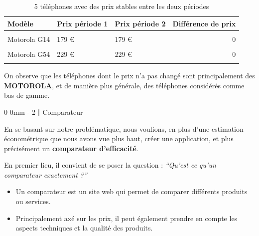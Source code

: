 \documentclass[
  12pt,
]{report}
\makeatletter
\renewcommand{\chapter}{%
    \clearpage %
    \@startsection{chapter}%
    {0} %
    {0mm} %
    {-\baselineskip} %
    {2\baselineskip} %
    {\normalfont\Huge\bfseries | \Huge\bfseries}%
}
\makeatother
\begin{document}
\begin{table}[!h]

\caption{\label{tab:unnamed-chunk-22}5 téléphones avec des prix stables entre les deux périodes}
\centering
\begin{tabular}[t]{lllr}
\toprule
\textbf{Modèle} & \textbf{Prix période 1} & \textbf{Prix période 2} & \textbf{Différence de prix}\\
\midrule
\cellcolor{gray!6}{MOTOROLA EDGE 40 NEO} & \cellcolor{gray!6}{399 €} & \cellcolor{gray!6}{399 €} & \cellcolor{gray!6}{0}\\
Motorola G14 & 179 € & 179 € & 0\\
\cellcolor{gray!6}{Motorola G53} & \cellcolor{gray!6}{199 €} & \cellcolor{gray!6}{199 €} & \cellcolor{gray!6}{0}\\
Motorola G54 & 229 € & 229 € & 0\\
\cellcolor{gray!6}{Motorola G84} & \cellcolor{gray!6}{299 €} & \cellcolor{gray!6}{299 €} & \cellcolor{gray!6}{0}\\
\bottomrule
\end{tabular}
\end{table}

On observe que les téléphones dont le prix n'a pas changé sont
principalement des \textbf{MOTOROLA}, et de manière plus générale, des
téléphones considérés comme bas de gamme.

\chapter{Comparateur}\label{comparateur}

En se basant sur notre problématique, nous voulions, en plus d'une
estimation économétrique que nous avons vue plus haut, créer une
application, et plus précisément un \textbf{comparateur d'efficacité}.

En premier lieu, il convient de se poser la question : \emph{``Qu'est ce
qu'un comparateur exactement ?''}

\begin{tcolorbox}[enhanced jigsaw, bottomrule=.15mm, toprule=.15mm, colback=white, opacitybacktitle=0.6, leftrule=.75mm, colframe=quarto-callout-tip-color-frame, colbacktitle=quarto-callout-tip-color!10!white, left=2mm, bottomtitle=1mm, opacityback=0, rightrule=.15mm, coltitle=black, toptitle=1mm, titlerule=0mm, title=\textcolor{quarto-callout-tip-color}{\faLightbulb}\hspace{0.5em}{Définition}, arc=.35mm, breakable]

\begin{itemize}
\item
  Un comparateur est un site web qui permet de comparer différents
  produits ou services.
\item
  Principalement axé sur les prix, il peut également prendre en compte
  les aspects techniques et la qualité des produits.
\end{itemize}

\end{tcolorbox}
\end{document}
